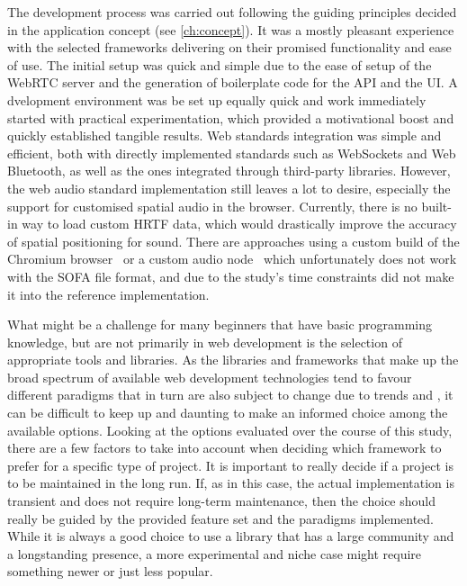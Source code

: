 The development process was carried out following the guiding principles decided in the application concept (see \autoref{ch:concept}).
It was a mostly pleasant experience with the selected frameworks delivering on their promised functionality and ease of use.
The initial setup was quick and simple due to the ease of setup of the WebRTC server and the generation of boilerplate code for the \ac{API} and the \ac{UI}.
A dvelopment environment was be set up equally quick and work immediately started with practical experimentation, which provided a motivational boost and quickly established tangible results.
Web standards integration was simple and efficient, both with directly implemented standards such as WebSockets and Web Bluetooth, as well as the ones integrated through third-party libraries.
However, the web audio standard implementation still leaves a lot to desire, especially the support for customised spatial audio in the browser.
Currently, there is no built-in way to load custom \ac{HRTF} data, which would drastically improve the accuracy of spatial positioning for sound.
There are approaches using a custom build of the Chromium browser~\parencite{chromiumCustomHrtf} or a custom audio node~\parencite{customHrtfAudioNode} which unfortunately does not work with the \ac{SOFA} file format, and due to the study's time constraints did not make it into the reference implementation.

What might be a challenge for many beginners that have basic programming knowledge, but are not primarily in web development is the selection of appropriate tools and libraries.
As the libraries and frameworks that make up the broad spectrum of available web development technologies tend to favour different paradigms that in turn are also subject to change due to trends and , it can be difficult to keep up and daunting to make an informed choice among the available options.
Looking at the options evaluated over the course of this study, there are a few factors to take into account when deciding which framework to prefer for a specific type of project.
It is important to really decide if a project is to be maintained in the long run.
If, as in this case, the actual implementation is transient and does not require long-term maintenance, then the choice should really be guided by the provided feature set and the paradigms implemented.
While it is always a good choice to use a library that has a large community and a longstanding presence, a more experimental and niche case might require something newer or just less popular.

